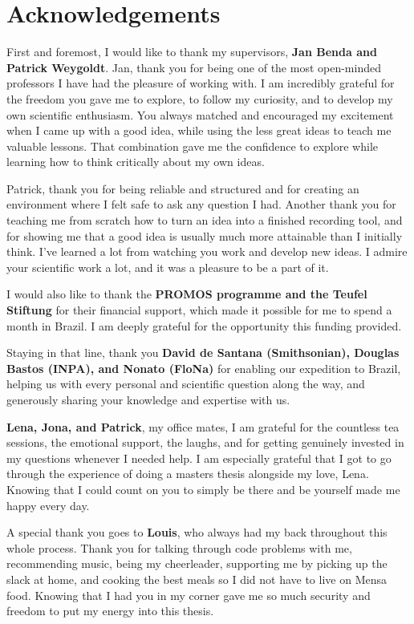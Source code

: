 
\section{Acknowledgements}

First and foremost, I would like to thank my supervisors, \textbf{Jan Benda and Patrick Weygoldt}. 
Jan, thank you for being one of the most open-minded professors I have had the pleasure of working with. 
I am incredibly grateful for the freedom you gave me to explore, to follow my curiosity, and to develop my own scientific enthusiasm. 
You always matched and encouraged my excitement when I came up with a good idea, while using the less great ideas to teach me valuable lessons. 
That combination gave me the confidence to explore while learning how to think critically about my own ideas.

Patrick, thank you for being reliable and structured and for creating an environment where I felt safe to ask any question I had. 
Another thank you for teaching me from scratch how to turn an idea into a finished recording tool, and for showing me that a good idea is usually much more attainable than I initially think. 
I've learned a lot from watching you work and develop new ideas.
I admire your scientific work a lot, and it was a pleasure to be a part of it. 

I would also like to thank the \textbf{PROMOS programme and the Teufel Stiftung} for their financial support, which made it possible for me to spend a month in Brazil. 
I am deeply grateful for the opportunity this funding provided.

Staying in that line, thank you \textbf{David de Santana (Smithsonian), Douglas Bastos (INPA), and Nonato (FloNa)} for enabling our expedition to Brazil, helping us with every  personal and scientific question along the way, 
and generously sharing your knowledge and expertise with us.

\textbf{Lena, Jona, and Patrick}, my office mates, I am grateful for the countless tea sessions, the emotional support, the laughs, and for getting genuinely invested in my questions whenever I needed help. 
I am especially grateful that I got to go through the experience of doing a masters thesis alongside my love, Lena. 
Knowing that I could count on you to simply be there and be yourself made me happy every day.

A special thank you goes to \textbf{Louis}, who always had my back throughout this whole process. 
Thank you for talking through code problems with me, recommending music, being my cheerleader, supporting me by picking up the slack at home, and cooking the best meals so I did not have to live on Mensa food. 
Knowing that I had you in my corner gave me so much security and freedom to put my energy into this thesis.

